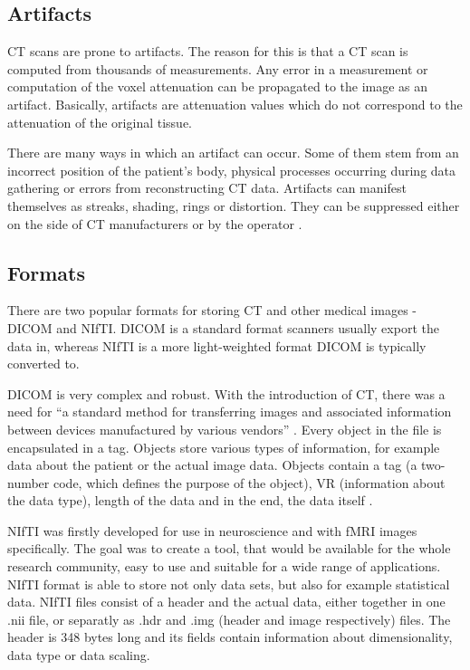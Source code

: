 \subsection{Artifacts}
CT scans are prone to artifacts. The reason for this is that a CT scan is computed from thousands of measurements. Any error in a measurement or computation of the voxel attenuation can be propagated to the image as an artifact. Basically, artifacts are attenuation values which do not correspond to the attenuation of the original tissue.

There are many ways in which an artifact can occur. Some of them stem from an incorrect position of the patient's body, physical processes occurring during data gathering or errors from reconstructing CT data. Artifacts can manifest themselves as streaks, shading, rings or distortion. They can be suppressed either on the side of CT manufacturers or by the operator \cite{barrett-keat2004}.  

\subsection{Formats}
There are two popular formats for storing CT and other medical images - DICOM and NIfTI. DICOM is a standard format scanners usually export the data in, whereas NIfTI is a more light-weighted format DICOM is typically converted to. 

DICOM is very complex and robust. With the introduction of CT, there was a need for ``a standard method for transferring images and associated information between devices manufactured by various vendors'' \cite{DICOM-spec}. Every object in the file is encapsulated in a tag. Objects store various types of information, for example data about the patient or the actual image data. Objects contain a tag (a two-number code, which defines the purpose of the object), VR (information about the data type), length of the data and in the end, the data itself \cite{neuro2016}.

NIfTI was firstly developed for use in neuroscience and with fMRI images specifically. The goal was to create a tool, that would be available for the whole research community, easy to use and suitable for a wide range of applications. NIfTI format is able to store not only data sets, but also for example statistical data. NIfTI files consist of a header and the actual data, either together in one .nii file, or separatly as .hdr and .img (header and image respectively) files. The header is 348 bytes long and its fields contain information about dimensionality, data type or data scaling. \cite{nifti} 

